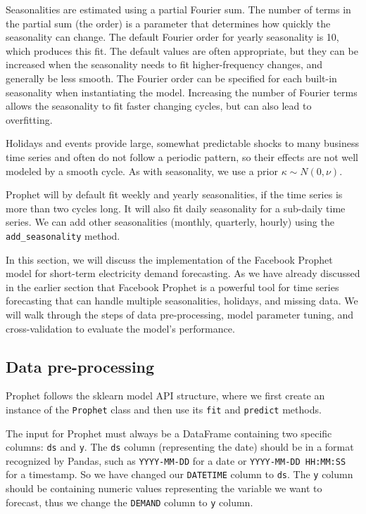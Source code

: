 \documentclass[mstat,12pt]{unswthesis}
\begin{document}
Seasonalities are estimated using a partial Fourier sum. The number of
terms in the partial sum (the order) is a parameter that determines how
quickly the seasonality can change. The default Fourier order for yearly
seasonality is 10, which produces this fit. The default values are often
appropriate, but they can be increased when the seasonality needs to fit
higher-frequency changes, and generally be less smooth. The Fourier
order can be specified for each built-in seasonality when instantiating
the model. Increasing the number of Fourier terms allows the seasonality
to fit faster changing cycles, but can also lead to overfitting.

Holidays and events provide large, somewhat predictable shocks to many
business time series and often do not follow a periodic pattern, so
their effects are not well modeled by a smooth cycle. As with
seasonality, we use a prior \(\kappa \sim {N(0,\nu)}\).

Prophet will by default fit weekly and yearly seasonalities, if the time
series is more than two cycles long. It will also fit daily seasonality
for a sub-daily time series. We can add other seasonalities (monthly,
quarterly, hourly) using the \texttt{add\_seasonality} method.

In this section, we will discuss the implementation of the Facebook
Prophet model for short-term electricity demand forecasting. As we have
already discussed in the earlier section that Facebook Prophet is a
powerful tool for time series forecasting that can handle multiple
seasonalities, holidays, and missing data. We will walk through the
steps of data pre-processing, model parameter tuning, and
cross-validation to evaluate the model's performance.

\subsection{Data pre-processing}\label{data-pre-processing}

Prophet follows the sklearn model API structure, where we first create
an instance of the \texttt{Prophet} class and then use its \texttt{fit}
and \texttt{predict} methods.

The input for Prophet must always be a DataFrame containing two specific
columns: \texttt{ds} and \texttt{y}. The \texttt{ds} column
(representing the date) should be in a format recognized by Pandas, such
as \texttt{YYYY-MM-DD} for a date or \texttt{YYYY-MM-DD\ HH:MM:SS} for a
timestamp. So we have changed our \texttt{DATETIME} column to
\texttt{ds}. The \texttt{y} column should be containing numeric values
representing the variable we want to forecast, thus we change the
\texttt{DEMAND} column to \texttt{y} column.
\end{document}
